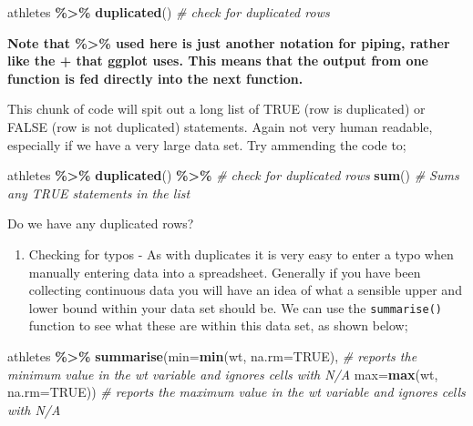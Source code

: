 \documentclass[
]{book}
\newenvironment{Shaded}{\begin{snugshade}}{\end{snugshade}}
\newcommand{\AttributeTok}[1]{\textcolor[rgb]{0.13,0.29,0.53}{#1}}
\newcommand{\CommentTok}[1]{\textcolor[rgb]{0.56,0.35,0.01}{\textit{#1}}}
\newcommand{\ConstantTok}[1]{\textcolor[rgb]{0.56,0.35,0.01}{#1}}
\newcommand{\FunctionTok}[1]{\textcolor[rgb]{0.13,0.29,0.53}{\textbf{#1}}}
\newcommand{\NormalTok}[1]{#1}
\newcommand{\SpecialCharTok}[1]{\textcolor[rgb]{0.81,0.36,0.00}{\textbf{#1}}}
\providecommand{\tightlist}{%
  \setlength{\itemsep}{0pt}\setlength{\parskip}{0pt}}
\begin{document}
\begin{Shaded}
\begin{Highlighting}[]
\NormalTok{athletes }\SpecialCharTok{\%\textgreater{}\%}
  \FunctionTok{duplicated}\NormalTok{() }\CommentTok{\# check for duplicated rows}
\end{Highlighting}
\end{Shaded}

\textbf{Note that \%\textgreater\% used here is just another notation for piping, rather like the + that ggplot uses. This means that the output from one function is fed directly into the next function.}

This chunk of code will spit out a long list of TRUE (row is duplicated) or FALSE (row is not duplicated) statements. Again not very human readable, especially if we have a very large data set. Try ammending the code to;

\begin{Shaded}
\begin{Highlighting}[]
\NormalTok{athletes }\SpecialCharTok{\%\textgreater{}\%}
  \FunctionTok{duplicated}\NormalTok{() }\SpecialCharTok{\%\textgreater{}\%} \CommentTok{\# check for duplicated rows}
  \FunctionTok{sum}\NormalTok{() }\CommentTok{\# Sums any TRUE statements in the list }
\end{Highlighting}
\end{Shaded}

Do we have any duplicated rows?

\begin{enumerate}
\def\labelenumi{\arabic{enumi})}
\setcounter{enumi}{1}
\tightlist
\item
  Checking for typos - As with duplicates it is very easy to enter a typo when manually entering data into a spreadsheet. Generally if you have been collecting continuous data you will have an idea of what a sensible upper and lower bound within your data set should be. We can use the \texttt{summarise()} function to see what these are within this data set, as shown below;
\end{enumerate}

\begin{Shaded}
\begin{Highlighting}[]
\NormalTok{athletes }\SpecialCharTok{\%\textgreater{}\%} 
  \FunctionTok{summarise}\NormalTok{(}\AttributeTok{min=}\FunctionTok{min}\NormalTok{(wt, }\AttributeTok{na.rm=}\ConstantTok{TRUE}\NormalTok{), }\CommentTok{\# reports the minimum value in the wt variable and ignores cells with N/A}
            \AttributeTok{max=}\FunctionTok{max}\NormalTok{(wt, }\AttributeTok{na.rm=}\ConstantTok{TRUE}\NormalTok{)) }\CommentTok{\# reports the maximum value in the wt variable and ignores cells with N/A}
\end{Highlighting}
\end{Shaded}
\end{document}
